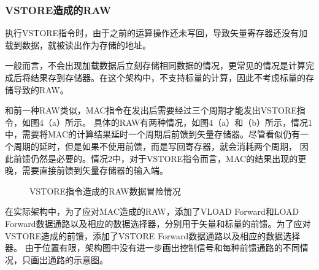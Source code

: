 \documentclass[UTF8]{ctexart}
\begin{document}
\subsubsection{VSTORE造成的RAW}
执行VSTORE指令时，由于之前的运算操作还未写回，导致矢量寄存器还没有加载到数据，就被读出作为存储的地址。

一般而言，不会出现加载数据后立刻存储相同数据的情况，更常见的情况是计算完成后将结果存到存储器。在这个架构中，不支持标量的计算，因此不考虑标量的存储导致的RAW。

和前一种RAW类似，MAC指令在发出后需要经过三个周期才能发出VSTORE指令，如图4（a）所示。
具体的RAW有两种情况，如图4（a）和（b）所示，情况1中，需要将MAC的计算结果延时一个周期后前馈到矢量存储器。尽管看似仍有一个周期的延时，但是如果不使用前馈，而是写回寄存器，就会消耗两个周期，
因此前馈仍然是必要的。情况2中，对于VSTORE指令而言，MAC的结果出现的更晚，需要直接前馈到矢量存储器的输入端。


\begin{figure}[htbp]
    \centering
    \caption{VSTORE指令造成的RAW数据冒险情况}
    \label{Fig.main}
\end{figure}

在实际架构中，为了应对MAC造成的RAW，添加了VLOAD Forward和LOAD Forward数据通路以及相应的数据选择器，分别用于矢量和标量的前馈。为了应对VSTORE造成的前馈，添加了VSTORE Forward数据通路以及相应的数据选择器。
由于位置有限，架构图中没有进一步画出控制信号和每种前馈通路的不同情况，只画出通路的示意图。
\end{document}

